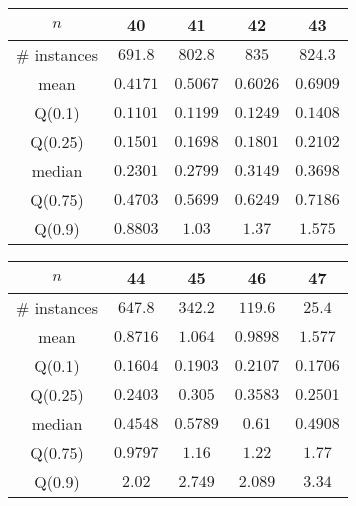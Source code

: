 \begin{tabular}{c|cccc} 
\hline 
$n$ & 40 & 41 & 42 & 43 \tabularnewline 
\hline 
\hline 
\# instances & $691.8$ & $802.8$ & $835$ & $824.3$ \tabularnewline 
mean & $0.4171$ & $0.5067$ & $0.6026$ & $0.6909$ \tabularnewline 
Q(0.1) & $0.1101$ & $0.1199$ & $0.1249$ & $0.1408$ \tabularnewline 
Q(0.25) & $0.1501$ & $0.1698$ & $0.1801$ & $0.2102$ \tabularnewline 
median & $0.2301$ & $0.2799$ & $0.3149$ & $0.3698$ \tabularnewline 
Q(0.75) & $0.4703$ & $0.5699$ & $0.6249$ & $0.7186$ \tabularnewline 
Q(0.9) & $0.8803$ & $1.03$ & $1.37$ & $1.575$ \tabularnewline 
\hline 
\end{tabular} 
\medskip{} 

\begin{tabular}{c|cccc} 
\hline 
$n$ & 44 & 45 & 46 & 47 \tabularnewline 
\hline 
\hline 
\# instances & $647.8$ & $342.2$ & $119.6$ & $25.4$ \tabularnewline 
mean & $0.8716$ & $1.064$ & $0.9898$ & $1.577$ \tabularnewline 
Q(0.1) & $0.1604$ & $0.1903$ & $0.2107$ & $0.1706$ \tabularnewline 
Q(0.25) & $0.2403$ & $0.305$ & $0.3583$ & $0.2501$ \tabularnewline 
median & $0.4548$ & $0.5789$ & $0.61$ & $0.4908$ \tabularnewline 
Q(0.75) & $0.9797$ & $1.16$ & $1.22$ & $1.77$ \tabularnewline 
Q(0.9) & $2.02$ & $2.749$ & $2.089$ & $3.34$ \tabularnewline 
\hline 
\end{tabular} 
\medskip{} 

